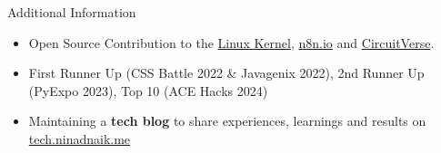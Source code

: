 \documentclass{resume} %
\begin{document}
\begin{rSection}{Additional Information}
    \begin{itemize}
        \setlength\itemsep{-0.6em}
        \item Open Source Contribution to the \href{https://git.kernel.org/pub/scm/linux/kernel/git/torvalds/linux.git/log/?qt=grep&q=ninadnaik07\%40gmail.com}{Linux Kernel}, \href{https://github.com/n8n-io/n8n-docs/commits/main/?author=ninadnaik10}{n8n.io} and \href{https://github.com/CircuitVerse/CircuitVerse/commits/master/?author=ninadnaik10}{CircuitVerse}.
        \item First Runner Up (CSS Battle 2022 \& Javagenix 2022), 2nd Runner Up (PyExpo 2023), Top 10 (ACE Hacks 2024)
        \item Maintaining a \textbf{tech blog} to share experiences, learnings and results on \href{https://tech.ninadnaik.me}{tech.ninadnaik.me}
    \end{itemize}

\end{rSection}

\end{document}
